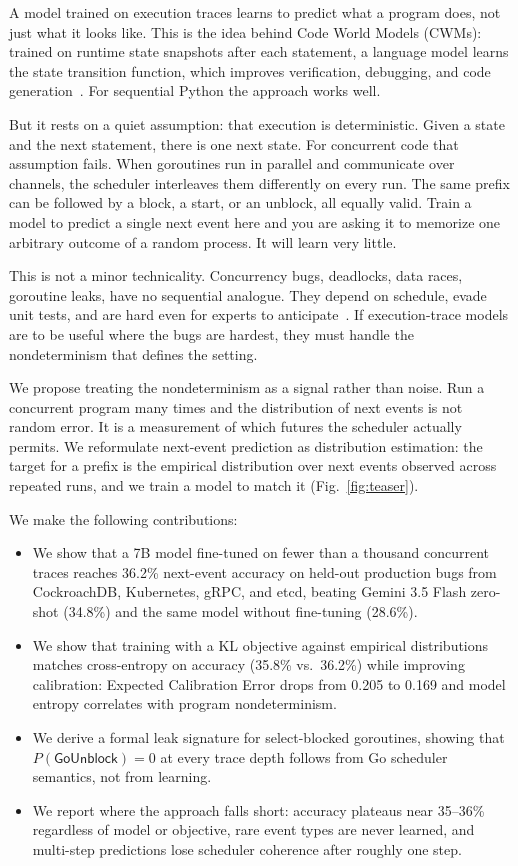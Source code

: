 \documentclass{svproc}
\newcommand{\punblock}{\textsf{GoUnblock}}
\begin{document}
A model trained on execution traces learns to predict what a program
does, not just what it looks like. This is the idea behind Code World
Models (CWMs): trained on runtime state snapshots after each statement,
a language model learns the state transition function, which improves
verification, debugging, and code generation~\cite{cwm}. For sequential
Python the approach works well.

But it rests on a quiet assumption: that execution is deterministic.
Given a state and the next statement, there is one next state. For
concurrent code that assumption fails. When goroutines run in parallel
and communicate over channels, the scheduler interleaves them differently
on every run. The same prefix can be followed by a block, a start, or
an unblock, all equally valid. Train a model to predict a single next
event here and you are asking it to memorize one arbitrary outcome of a
random process. It will learn very little.

This is not a minor technicality. Concurrency bugs, deadlocks, data
races, goroutine leaks, have no sequential analogue. They depend on
schedule, evade unit tests, and are hard even for experts to
anticipate~\cite{concur,goker}. If execution-trace models are to be
useful where the bugs are hardest, they must handle the nondeterminism
that defines the setting.

We propose treating the nondeterminism as a signal rather than noise.
Run a concurrent program many times and the distribution of next events
is not random error. It is a measurement of which futures the scheduler
actually permits. We reformulate next-event prediction as distribution
estimation: the target for a prefix is the empirical distribution over
next events observed across repeated runs, and we train a model to match
it (Fig.~\ref{fig:teaser}).

We make the following contributions:

\begin{itemize}
\item We show that a 7B model fine-tuned on fewer than a thousand
  concurrent traces reaches 36.2\% next-event accuracy on held-out
  production bugs from CockroachDB, Kubernetes, gRPC, and etcd,
  beating Gemini 3.5 Flash zero-shot (34.8\%) and the same
  model without fine-tuning (28.6\%).
\item We show that training with a KL objective against empirical
  distributions matches cross-entropy on accuracy (35.8\% vs.\ 36.2\%)
  while improving calibration: Expected Calibration Error drops from
  0.205 to 0.169 and model entropy correlates with program
  nondeterminism.
\item We derive a formal leak signature for select-blocked goroutines,
  showing that $P(\punblock)=0$ at every trace depth follows from Go
  scheduler semantics, not from learning.
\item We report where the approach falls short: accuracy plateaus near
  35--36\% regardless of model or objective, rare event types are never
  learned, and multi-step predictions lose scheduler coherence after
  roughly one step.
\end{itemize}
\end{document}

